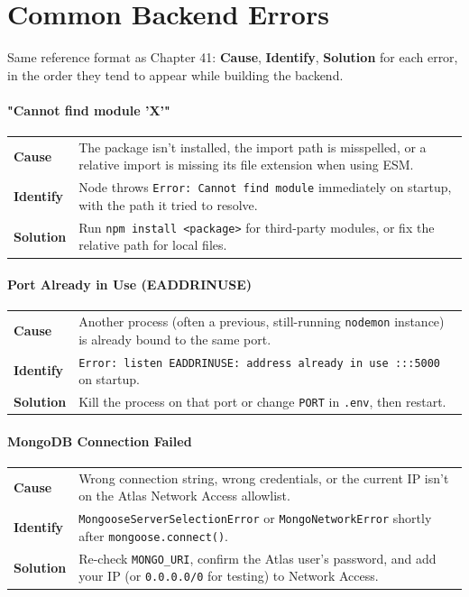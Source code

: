 \chapter{Common Backend Errors}

\begin{notebox}[NOTE]
Same reference format as Chapter 41: \textbf{Cause}, \textbf{Identify},
\textbf{Solution} for each error, in the order they tend to appear while
building the backend.
\end{notebox}

\subsubsection*{"Cannot find module 'X'"}
\noindent\begin{tabularx}{\textwidth}{@{}>{\bfseries}p{2.3cm}X@{}}
\toprule
Cause & The package isn't installed, the import path is misspelled, or a
relative import is missing its file extension when using ESM. \\
Identify & Node throws \texttt{Error: Cannot find module} immediately on
startup, with the path it tried to resolve. \\
Solution & Run \texttt{npm install <package>} for third-party modules, or
fix the relative path for local files. \\
\bottomrule
\end{tabularx}

\subsubsection*{Port Already in Use (EADDRINUSE)}
\noindent\begin{tabularx}{\textwidth}{@{}>{\bfseries}p{2.3cm}X@{}}
\toprule
Cause & Another process (often a previous, still-running \texttt{nodemon}
instance) is already bound to the same port. \\
Identify & \texttt{Error: listen EADDRINUSE: address already in use
:::5000} on startup. \\
Solution & Kill the process on that port or change \texttt{PORT} in
\texttt{.env}, then restart. \\
\bottomrule
\end{tabularx}

\subsubsection*{MongoDB Connection Failed}
\noindent\begin{tabularx}{\textwidth}{@{}>{\bfseries}p{2.3cm}X@{}}
\toprule
Cause & Wrong connection string, wrong credentials, or the current IP
isn't on the Atlas Network Access allowlist. \\
Identify & \texttt{MongooseServerSelectionError} or
\texttt{MongoNetworkError} shortly after \texttt{mongoose.connect()}. \\
Solution & Re-check \texttt{MONGO\_URI}, confirm the Atlas user's
password, and add your IP (or \texttt{0.0.0.0/0} for testing) to Network
Access. \\
\bottomrule
\end{tabularx}

